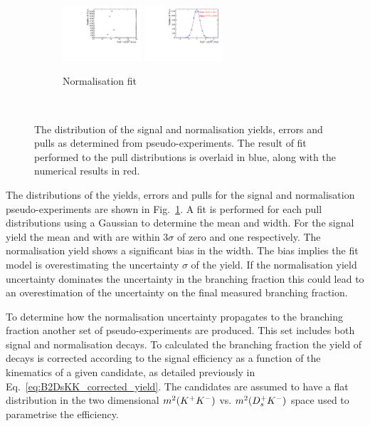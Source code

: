 \begin{figure}[!h]
\begin{subfigure}[t]{1.0\textwidth}
      \includegraphics[width=0.32\textwidth]{figs/B2DsKK/Plots_DsD0_nsig_err.pdf}
      \includegraphics[width=0.32\textwidth]{figs/B2DsKK/Plots_DsD0_nsig_pul.pdf}
      \caption{Normalisation fit}
   \end{subfigure}\\
   \caption{The distribution of the signal and normalisation yields, errors and pulls as determined from pseudo-experiments. The result of fit performed to the pull distributions is overlaid in blue, along with the numerical results in red.}
   \label{fig:B2DsKK_Pulls}
\end{figure}

The distributions of the yields, errors and pulls for the signal and normalisation pseudo-experiments are shown in Fig.~\ref{fig:B2DsKK_Pulls}. A fit is performed for each pull distributions using a Gaussian to determine the mean and width. 
For the signal yield the mean and with are within $3\sigma$ of zero and one respectively. The normalisation yield shows a significant bias in the width. The bias implies the fit model is overestimating the uncertainty $\sigma$ of the yield.
If the normalisation yield uncertainty dominates the uncertainty in the branching fraction this could lead to an overestimation of the uncertainty on the final measured branching fraction.

To determine how the normalisation uncertainty propagates to the branching fraction another set of pseudo-experiments are produced.
This set includes both signal and normalisation decays. To calculated the branching fraction the yield of \decay{\Bp}{\Dsp\Kp\Km} decays is corrected according to the signal efficiency as a function of the kinematics of a given candidate, as detailed previously in Eq.~\ref{eq:B2DsKK_corrected_yield}. The candidates are assumed to have a flat distribution in the two dimensional $m^{2}({{K}^+}{{K}^-})$ vs. $m^{2}({{D}^+_{s}}{{K}^-})$ space used to parametrise the efficiency. 

